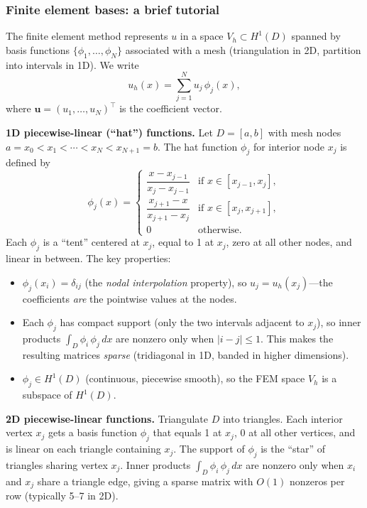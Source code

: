 \documentclass[11pt]{article}
\newcommand{\bu}{\mathbf{u}}
\begin{document}
\subsubsection{Finite element bases: a brief tutorial}\label{sec:FEM_tutorial}

The finite element method represents $u$ in a space $V_h \subset H^1(D)$ spanned by basis functions $\{\phi_1, \ldots, \phi_N\}$ associated with a mesh (triangulation in 2D, partition into intervals in 1D).  We write
\[
  u_h(x) = \sum_{j=1}^N u_j\, \phi_j(x),
\]
where $\bu = (u_1, \ldots, u_N)^\top$ is the coefficient vector.

\medskip\noindent\textbf{1D piecewise-linear (``hat'') functions.}  Let $D = [a,b]$ with mesh nodes $a = x_0 < x_1 < \cdots < x_N < x_{N+1} = b$.  The hat function $\phi_j$ for interior node $x_j$ is defined by
\[
  \phi_j(x) = \begin{cases}
    \dfrac{x - x_{j-1}}{x_j - x_{j-1}} & \text{if } x \in [x_{j-1}, x_j], \\[6pt]
    \dfrac{x_{j+1} - x}{x_{j+1} - x_j} & \text{if } x \in [x_j, x_{j+1}], \\[6pt]
    0 & \text{otherwise}.
  \end{cases}
\]
Each $\phi_j$ is a ``tent'' centered at $x_j$, equal to 1 at $x_j$, zero at all other nodes, and linear in between.  The key properties:
\begin{itemize}[nosep]
  \item $\phi_j(x_i) = \delta_{ij}$ (the \emph{nodal interpolation} property), so $u_j = u_h(x_j)$---the coefficients \emph{are} the pointwise values at the nodes.
  \item Each $\phi_j$ has compact support (only the two intervals adjacent to $x_j$), so inner products $\int_D \phi_i\, \phi_j\, dx$ are nonzero only when $|i - j| \leq 1$.  This makes the resulting matrices \emph{sparse} (tridiagonal in 1D, banded in higher dimensions).
  \item $\phi_j \in H^1(D)$ (continuous, piecewise smooth), so the FEM space $V_h$ is a subspace of $H^1(D)$.
\end{itemize}

\medskip\noindent\textbf{2D piecewise-linear functions.}  Triangulate $D$ into triangles.  Each interior vertex $x_j$ gets a basis function $\phi_j$ that equals 1 at $x_j$, 0 at all other vertices, and is linear on each triangle containing $x_j$.  The support of $\phi_j$ is the ``star'' of triangles sharing vertex $x_j$.  Inner products $\int_D \phi_i\, \phi_j\, dx$ are nonzero only when $x_i$ and $x_j$ share a triangle edge, giving a sparse matrix with $O(1)$ nonzeros per row (typically 5--7 in 2D).
\end{document}
